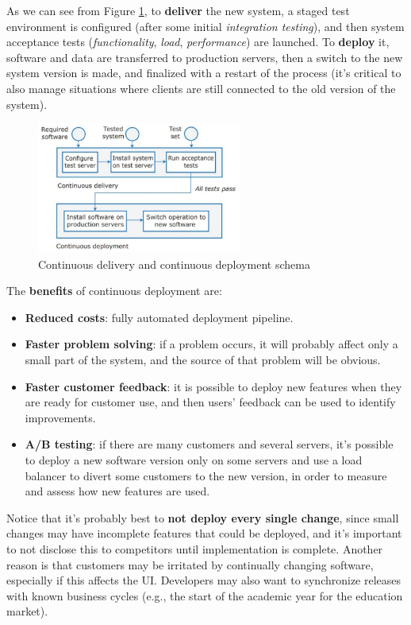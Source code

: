 As we can see from Figure \ref{fig:CDCD}, to \textbf{deliver} the new system, a staged test environment is configured (after some initial \textit{integration testing}), and then system acceptance tests (\textit{functionality}, \textit{load}, \textit{performance}) are launched. To \textbf{deploy} it, software and data are transferred to production servers, then a switch to the new system version is made, and finalized with a restart of the process (it's critical to also manage situations where clients are still connected to the old version of the system).

\begin{figure} [H]
    \centering
    \includegraphics[width=0.6\textwidth]{images/DevOps/CDCD.PNG}
    \caption{Continuous delivery and continuous deployment schema}
    \label{fig:CDCD}
\end{figure} 

\newpage
The \textbf{benefits} of continuous deployment are:

\begin{itemize}
    \item \textbf{Reduced costs}: fully automated deployment pipeline.
    \item \textbf{Faster problem solving}: if a problem occurs, it will probably affect only a small part of the system, and the source of that problem will be obvious.
    \item \textbf{Faster customer feedback}: it is possible to deploy new features when they are ready for customer use, and then users’ feedback can be used to identify improvements.
    \item \textbf{A/B testing}: if there are many customers and several servers, it's possible to deploy a new software version only on some servers and use a load balancer to divert some customers to the new version, in order to measure and assess how new features are used.
\end{itemize}

Notice that it's probably best to \textbf{not deploy every single change}, since small changes may have incomplete features that could be deployed, and it's important to not disclose this to competitors until implementation is complete. Another reason is that customers may be irritated by continually changing software, especially if this affects the UI. Developers may also want to synchronize releases with known business cycles (e.g., the start of the academic year for the education market).

